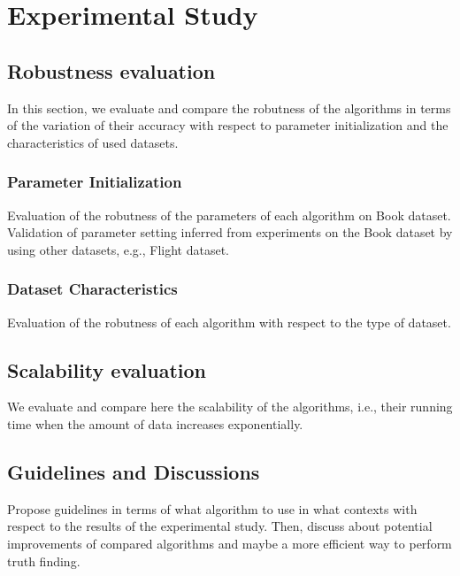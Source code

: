 \section{Experimental Study}

\subsection{Robustness evaluation}
In this section, we evaluate and compare the robutness of the algorithms
in terms of the variation of their accuracy with respect to parameter initialization
and the characteristics of used datasets.

\subsubsection{Parameter Initialization}
Evaluation of the robutness of the parameters of each algorithm on Book dataset.
Validation of parameter setting inferred from experiments on the Book
dataset by using other datasets, e.g., Flight dataset. 

\subsubsection{Dataset Characteristics}
Evaluation of the robutness of each algorithm with respect to the type of dataset.

\subsection{Scalability evaluation}
We evaluate and compare here the scalability of the algorithms, i.e., their
running time when the amount of data increases exponentially.

\subsection{Guidelines and Discussions}
Propose guidelines in terms of what algorithm to use in what contexts with respect to 
the results of the experimental study. Then, discuss about potential improvements of 
compared algorithms and maybe a more efficient way to perform truth finding.

